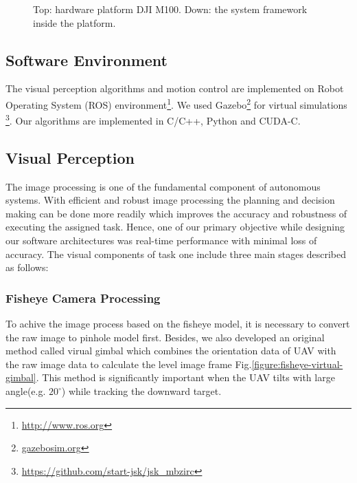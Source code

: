 \documentclass{standalone}
\begin{document}
\begin{figure}[h]
\begin{center}
\begin{minipage}{1.0\hsize}
\begin{center}
          \end{center}
        \end{minipage}
    \end{center}
    \caption{Top: hardware platform DJI M100. Down: the system framework inside the platform.}
    \label{figure:task1-platform}
\end{figure}


\subsection{Software Environment}
The visual perception algorithms and motion control are implemented
on Robot Operating System (ROS) environment\footnote{\url{http://www.ros.org}}.
We used Gazebo\footnote{\url{gazebosim.org}} for virtual simulations
\footnote{\url{https://github.com/start-jsk/jsk_mbzirc}}. Our
algorithms are implemented in C/C++, Python and CUDA-C.


\subsection{Visual Perception}

The image processing is one of the fundamental component of autonomous
systems. With efficient and robust image processing the planning and
decision making can be done more readily which improves the accuracy
and robustness of executing the assigned task. Hence, one of our
primary objective while designing our software architectures was
real-time performance with minimal loss of accuracy. The visual
components of task one include three main stages described as follows:

\subsubsection{Fisheye Camera Processing}
To achive the image process based on the fisheye model, it is necessary to convert the raw image to pinhole model first. Besides, we also developed an original method called virual gimbal which combines the orientation data of UAV with the raw image data to calculate the level image frame Fig.\ref{figure:fisheye-virtual-gimbal}. This method is significantly important when the UAV tilts with large angle(e.g. $20^\circ$) while tracking the downward target.
\end{document}
